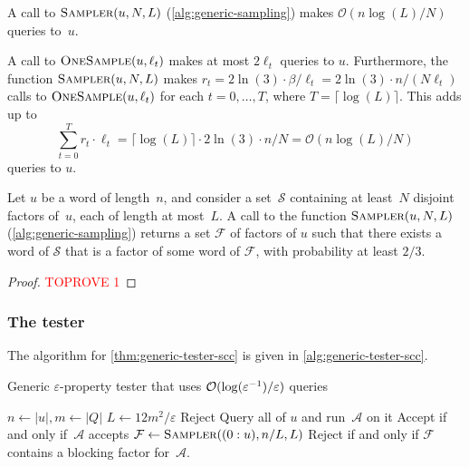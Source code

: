\documentclass[letterpaper, USenglish, cleveref, autoref, thm-restate, numberwithinsect]{lipics-v2021}
\theoremstyle{theorem}
\theoremstyle{definition}
\newcommand{\Aa}{\mathcal{A}}
\newcommand{\cO}{\mathcal{O}}
\newcommand{\eps}{\varepsilon}
\newcommand{\Ff}{\mathcal{F}}
\newcommand{\lang}[1]{\mathcal{L}(#1)}
\newcommand{\Ss}{\mathcal{S}}
\newcommand{\timedword}[2]{(#1:#2)}
\newcommand{\twu}{\timedword{0}{u}}
\newcommand{\epslogeps}[1][]
{\ifthenelse{\equal{#1}{}}{\log(\eps^{-1})/\eps}{\log^{ #1 }(\eps^{-1})/\eps}}
\begin{document}
\begin{claim}\label{claim:generic-sampling-alg-complexity}
    A call to $\Call{Sampler}{u, N, L}$ (\cref{alg:generic-sampling}) makes $\cO(n\log(L)/N)$ queries to~$u$.
\end{claim}
\begin{claimproof}
    A call to $\Call{OneSample}{u, \ell_t}$ makes at most $2\ell_t$ queries to $u$.
    Furthermore, the function $\Call{Sampler}{u, N, L}$ makes $r_t = 2\ln(3)\cdot \beta/\ell_t = 2\ln(3)\cdot n/(N\ell_t)$ calls to $\Call{OneSample}{u, \ell_t}$ for each $t = 0,\ldots, T$, where $T = \lceil\log(L)\rceil$.
    This adds up to \[\sum_{t=0}^T  r_t \cdot\ell_t = \lceil\log(L)\rceil \cdot2\ln(3)\cdot n/N = \cO(n\log(L)/N)\] queries to $u$.
\end{claimproof}

\begin{lemma}\label{lemma:generic-sampling-alg}
    Let $u$ be a word of length~$n$, and consider a set~$\Ss$ containing at least~$N$ disjoint factors of~$u$, each of length at most~$L$.
    A call to the function $\Call{Sampler}{u, N, L}$ (\cref{alg:generic-sampling}) returns a set $\Ff$ of factors of $u$ such that there exists a word of $\Ss$ that is a factor of some word of $\Ff$, with probability at least $2/3$.
\end{lemma}

\begin{proof}\textcolor{red}{TOPROVE 1}\end{proof}

\subsubsection{The tester}

The algorithm for \cref{thm:generic-tester-scc} is given in \cref{alg:generic-tester-scc}.

\begin{algorithm}[htbp]
\caption{Generic $\eps$-property tester that uses $\cO(\epslogeps)$ queries}\label{alg:generic-tester-scc}
\begin{algorithmic}[1] \Function{Tester}{$u, \eps$}
\State $n \gets |u|, m\gets |Q|$
\State $L \gets 12m^2/\eps$
\If{$\lang{\Aa} \cap \Sigma^n = \emptyset$}
    \State Reject
    \State Query all of $u$ and run~$\Aa$ on it
    \State Accept if and only if~$\Aa$ accepts
\Else \label{line:intersting-case}
    \State \label{line:compute-f}$\Ff \gets\Call{Sampler}{\twu, n/L, L}$
    \State Reject if and only if $\Ff$ contains a blocking factor for~$\Aa$.
\EndIf
\EndFunction
\end{algorithmic}
\end{algorithm}
\end{document}
